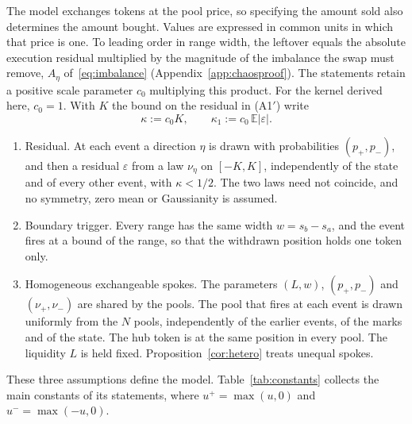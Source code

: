 \documentclass[11pt,a4paper]{article}
\theoremstyle{siphon}
\begin{document}
The model exchanges tokens at the pool price, so specifying the amount sold also determines the amount bought. Values are expressed in common units in which that price is one. To leading order in range width, the leftover equals the absolute execution residual multiplied by the magnitude of the imbalance the swap must remove, $A_\eta$ of~\eqref{eq:imbalance} (Appendix~\ref{app:chaosproof}). The statements retain a positive scale parameter $c_0$ multiplying this product. For the kernel derived here, $c_0 = 1$. With $K$ the bound on the residual in (A1$'$) write
\[
\kappa := c_0 K, \qquad \kappa_1 := c_0\,\mathbb{E}|\varepsilon| .
\]
\begin{enumerate}[leftmargin=*,label=(A\arabic*$'$)]
\item Residual. At each event a direction $\eta$ is drawn with probabilities $(p_+, p_-)$, and then a residual $\varepsilon$ from a law $\nu_\eta$ on $[-K, K]$, independently of the state and of every other event, with $\kappa < 1/2$. The two laws need not coincide, and no symmetry, zero mean or Gaussianity is assumed.
\setcounter{enumi}{1}
\item[(A2)] Boundary trigger. Every range has the same width $w = s_b - s_a$, and the event fires at a bound of the range, so that the withdrawn position holds one token only.
\item[(A3)] Homogeneous exchangeable spokes. The parameters $(L, w)$, $(p_+, p_-)$ and $(\nu_+, \nu_-)$ are shared by the pools. The pool that fires at each event is drawn uniformly from the $N$ pools, independently of the earlier events, of the marks and of the state. The hub token is at the same position in every pool. The liquidity $L$ is held fixed. Proposition~\ref{cor:hetero} treats unequal spokes.
\end{enumerate}
These three assumptions define the model. Table~\ref{tab:constants} collects the main constants of its statements, where $u^+ = \max(u, 0)$ and $u^- = \max(-u, 0)$.
\end{document}
